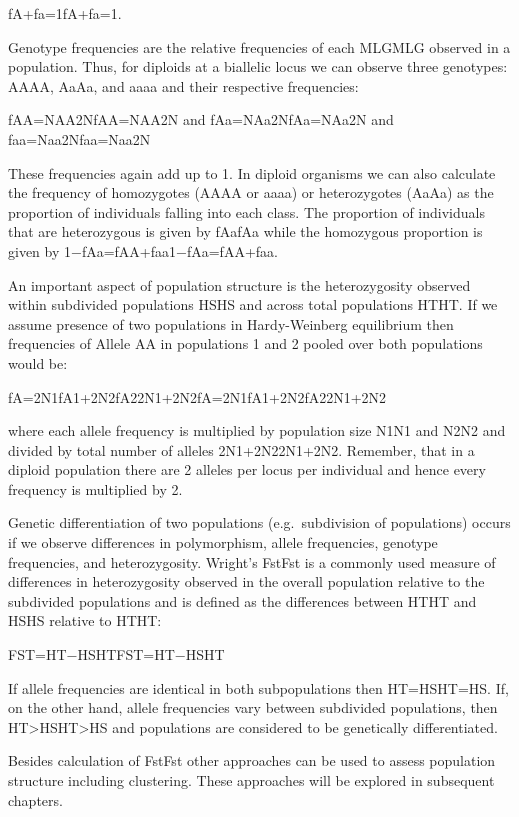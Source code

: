 \documentclass[12pt,]{krantz}
\theoremstyle{definition}
\theoremstyle{definition}
\theoremstyle{definition}
\theoremstyle{remark}
\begin{document}
fA+fa=1fA+fa=1.

Genotype frequencies are the relative frequencies of each MLGMLG
observed in a population. Thus, for diploids at a biallelic locus we can
observe three genotypes: AAAA, AaAa, and aaaa and their respective
frequencies:

fAA=NAA2NfAA=NAA2N and fAa=NAa2NfAa=NAa2N and faa=Naa2Nfaa=Naa2N

These frequencies again add up to 1. In diploid organisms we can also
calculate the frequency of homozygotes (AAAA or aaaa) or heterozygotes
(AaAa) as the proportion of individuals falling into each class. The
proportion of individuals that are heterozygous is given by fAafAa while
the homozygous proportion is given by 1−fAa=fAA+faa1−fAa=fAA+faa.

An important aspect of population structure is the heterozygosity
observed within subdivided populations HSHS and across total populations
HTHT. If we assume presence of two populations in Hardy-Weinberg
equilibrium then frequencies of Allele AA in populations 1 and 2 pooled
over both populations would be:

fA=2N1fA1+2N2fA22N1+2N2fA=2N1fA1+2N2fA22N1+2N2

where each allele frequency is multiplied by population size N1N1 and
N2N2 and divided by total number of alleles 2N1+2N22N1+2N2. Remember,
that in a diploid population there are 2 alleles per locus per
individual and hence every frequency is multiplied by 2.

Genetic differentiation of two populations (e.g.~subdivision of
populations) occurs if we observe differences in polymorphism, allele
frequencies, genotype frequencies, and heterozygosity. Wright's FstFst
is a commonly used measure of differences in heterozygosity observed in
the overall population relative to the subdivided populations and is
defined as the differences between HTHT and HSHS relative to HTHT:

FST=HT−HSHTFST=HT−HSHT

If allele frequencies are identical in both subpopulations then
HT=HSHT=HS. If, on the other hand, allele frequencies vary between
subdivided populations, then HT\textgreater{}HSHT\textgreater{}HS and
populations are considered to be genetically differentiated.

Besides calculation of FstFst other approaches can be used to assess
population structure including clustering. These approaches will be
explored in subsequent chapters.
\end{document}
